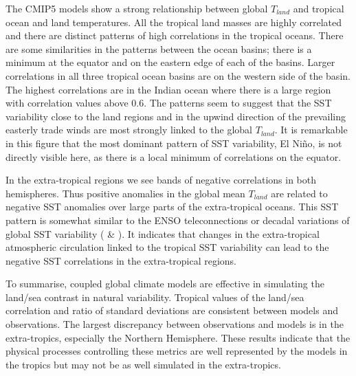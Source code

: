 The CMIP5 models show a strong relationship between global $T_{land}$ and 
tropical ocean and land temperatures. All the tropical land masses are highly 
correlated and there are distinct patterns of high correlations in the tropical 
oceans. There are some similarities in the patterns between the ocean basins; 
there is a minimum at the equator and on the eastern edge of each of the basins. 
Larger correlations in all three tropical ocean basins are on the western side 
of the basin. The highest correlations are in the Indian ocean where there is a 
large region with correlation values above 0.6.  The patterns seem to suggest 
that the SST variability close to the land regions and in the upwind direction 
of the prevailing easterly trade winds are most strongly linked to the global 
$T_{land}$. It is remarkable in this figure that the most dominant pattern of 
SST variability, El Ni{\~n}o, is not directly visible here, as there is a local 
minimum of correlations on the equator.

In the extra-tropical regions we see bands of negative correlations in both 
hemispheres. Thus positive anomalies in the global mean $T_{land}$ are related 
to negative SST anomalies over large parts of the extra-tropical oceans. This 
SST pattern is somewhat similar to the ENSO teleconnections or decadal 
variations of global SST variability (\citealt{Lau1996} \& 
\citealt{Dommenget2008}).  It indicates that changes in the extra-tropical 
atmospheric circulation linked to the tropical SST variability can lead to the 
negative SST correlations in the extra-tropical regions.

To summarise, coupled global climate models are effective in simulating the 
land/sea contrast in natural variability. Tropical values of the land/sea 
correlation and ratio of standard deviations are consistent between models and 
observations. The largest discrepancy between observations and models is in the 
extra-tropics, especially the Northern Hemisphere. These results indicate that 
the physical processes controlling these metrics are well represented by the 
models in the tropics but may not be as well simulated in the extra-tropics.

